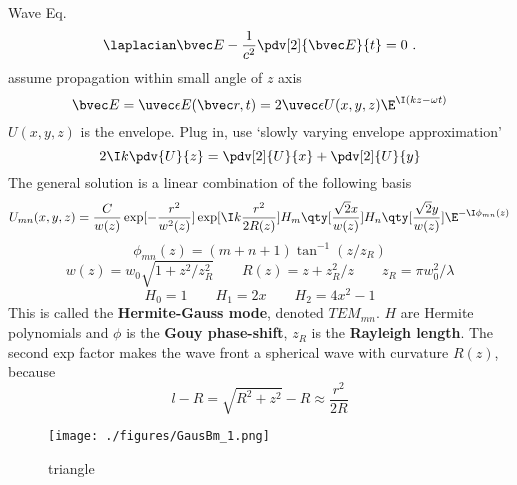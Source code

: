 
\begin{issues}
\issueDraft
\issueMissDepend
{}
\end{issues}


Wave Eq.
\begin{equation}
\laplacian \bvec E - \frac{1}{c^2} \pdv[2]{\bvec E}{t} = 0~.
\end{equation}
assume propagation within small angle of $z$ axis
\begin{equation}
\bvec E = \uvec \epsilon E(\bvec r, t) = 2\uvec \epsilon U(x, y, z) \E^{\I (kz - \omega t)}
\end{equation}
$U(x, y, z)$ is the envelope. Plug in, use ‘slowly varying envelope approximation’
\begin{equation}
2\I k\pdv{U}{z} = \pdv[2]{U}{x} + \pdv[2]{U}{y}
\end{equation}
The general solution is a linear combination of the following basis
\begin{equation}
U_{mn}(x, y, z) = \frac{C}{w(z)} \exp[-\frac{r^2}{w^2(z)}]\exp[\I k\frac{r^2}{2R(z)}] H_m\qty[\frac{\sqrt{2}x}{w(z)}] H_n \qty[\frac{\sqrt{2} y}{w(z)}] \E^{-\I \phi_{mn}(z)}
\end{equation}
\begin{equation}
\phi_{mn}(z) = (m+n+1)\tan^{-1}(z/z_R)
\end{equation}
\begin{equation}
w(z) = w_0\sqrt{1 + z^2/z_R^2}
\qquad
R(z) = z + z_R^2 / z
\qquad
z_R = \pi w_0^2 / \lambda
\end{equation}
\begin{equation}
H_0 = 1 \qquad H_1 = 2x \qquad H_2 = 4x^2 - 1
\end{equation}
This is called the \textbf{Hermite-Gauss mode}, denoted $TEM_{mn}$. $H$ are Hermite polynomials and $\phi$ is the \textbf{Gouy phase-shift}, $z_R$ is the \textbf{Rayleigh length}. The second exp factor makes the wave front a spherical wave with curvature $R(z)$, because
\begin{equation}
l - R = \sqrt{R^2 + z^2} - R \approx \frac{r^2}{2R}
\end{equation}

\begin{figure}[ht]
\centering
\texttt{[image: ./figures/GausBm\_1.png]}
\caption{triangle} \label{GausBm_fig1}
\end{figure}

